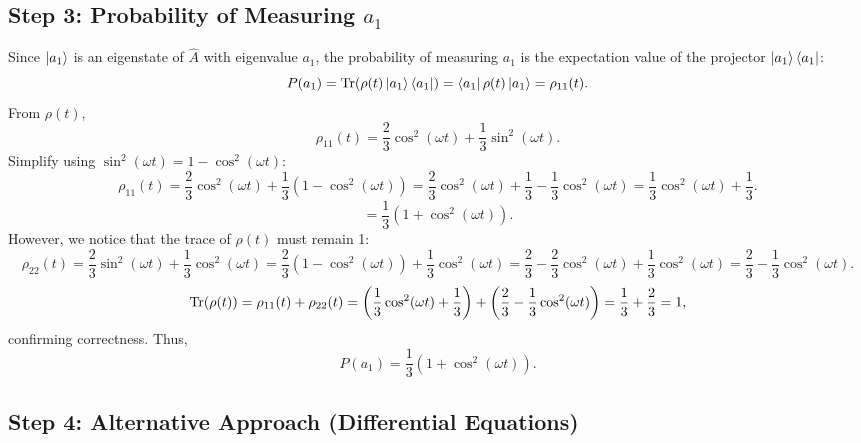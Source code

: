 \documentclass[a4paper,12pt]{article}
\begin{document}
\subsection*{Step 3: Probability of Measuring \(a_1\)}

Since \(\ket{a_1}\) is an eigenstate of \(\hat{A}\) with eigenvalue \(a_1\), the probability of measuring \(a_1\) is the expectation value of the projector \(\ket{a_1} \bra{a_1}\):
\[
P(a_1) = \Tr(\rho(t) \ket{a_1} \bra{a_1}) = \bra{a_1} \rho(t) \ket{a_1} = \rho_{11}(t).
\]
From \(\rho(t)\),
\[
\rho_{11}(t) = \frac{2}{3} \cos^2(\omega t) + \frac{1}{3} \sin^2(\omega t).
\]
Simplify using \(\sin^2(\omega t) = 1 - \cos^2(\omega t)\):
\[
\rho_{11}(t) = \frac{2}{3} \cos^2(\omega t) + \frac{1}{3} (1 - \cos^2(\omega t)) = \frac{2}{3} \cos^2(\omega t) + \frac{1}{3} - \frac{1}{3} \cos^2(\omega t) = \frac{1}{3} \cos^2(\omega t) + \frac{1}{3}.
\]
\[
= \frac{1}{3} (1 + \cos^2(\omega t)).
\]
However, we notice that the trace of \(\rho(t)\) must remain 1:
\[
\rho_{22}(t) = \frac{2}{3} \sin^2(\omega t) + \frac{1}{3} \cos^2(\omega t) = \frac{2}{3} (1 - \cos^2(\omega t)) + \frac{1}{3} \cos^2(\omega t) = \frac{2}{3} - \frac{2}{3} \cos^2(\omega t) + \frac{1}{3} \cos^2(\omega t) = \frac{2}{3} - \frac{1}{3} \cos^2(\omega t).
\]
\[
\Tr(\rho(t)) = \rho_{11}(t) + \rho_{22}(t) = \left( \frac{1}{3} \cos^2(\omega t) + \frac{1}{3} \right) + \left( \frac{2}{3} - \frac{1}{3} \cos^2(\omega t) \right) = \frac{1}{3} + \frac{2}{3} = 1,
\]
confirming correctness. Thus,
\[
P(a_1) = \frac{1}{3} (1 + \cos^2(\omega t)).
\]

\subsection*{Step 4: Alternative Approach (Differential Equations)}
\end{document}
